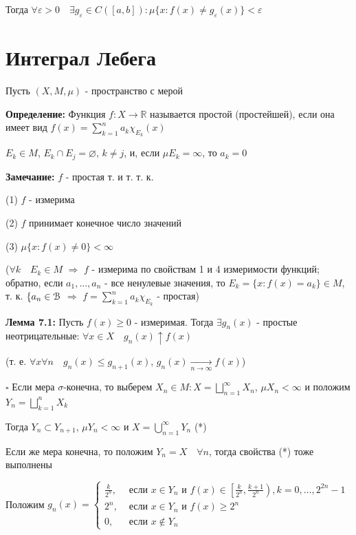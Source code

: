 \documentclass[a4paper]{report}
\begin{document}
Тогда $\forall\varepsilon>0\quad\exists g_\varepsilon\in C([a,b])\colon\mu\{x\colon f(x)\ne g_\varepsilon(x)\}<\varepsilon$




\chapter{Интеграл Лебега}

Пусть $(X,M,\mu)$ - пространство с мерой

\noindent\textbf{Определение:} Функция $f\colon X\to\mathbb R$ называется простой (простейшей), если она имеет вид $f(x)=\sum\limits_{k=1}^n a_k\chi_{E_k}(x)$

$E_k\in M$, $E_k\cap E_j=\varnothing$, $k\ne j$, и, если $\mu E_k=\infty$, то $a_k=0$
\bigskip

\noindent\textbf{Замечание:} $f$ - простая т. и т. т. к.

(1) $f$ - измерима

(2) $f$ принимает конечное число значений

(3) $\mu\{x\colon f(x)\ne0\}<\infty$

\noindent ($\forall k\quad E_k\in M$ $\Rightarrow$ $f$ - измерима по свойствам 1 и 4 измеримости функций; обратно, если $a_1,\ldots,a_n$ - все ненулевые значения, то
$E_k=\{x\colon f(x)=a_k\}\in M$, т. к. $\{a_n\in\EuScript B$ $\Rightarrow$ $f=\sum\limits_{k=1}^n a_k\chi_{E_k}$ - простая)
\bigskip

\noindent\textbf{Лемма 7.1:} Пусть $f(x)\ge0$ - измеримая. Тогда $\exists g_n(x)$ - простые неотрицательные: $\forall x\in X\quad g_n(x)\uparrow f(x)$ 

(т. е. $\forall x\forall n\quad g_n(x)\le g_{n+1}(x)$, $g_n(x)\xrightarrow[n\to\infty]{}f(x)$)

\noindent $\square$ Если мера $\sigma$-конечна, то выберем $X_n\in M\colon X=\bigsqcup\limits_{n=1}^\infty X_n$, $\mu X_n<\infty$ и положим $Y_n=\bigsqcup\limits_{k=1}^n X_k$

Тогда $Y_n\subset Y_{n+1}$, $\mu Y_n<\infty$ и $X=\bigcup\limits_{n=1}^\infty Y_n$ (*)

Если же мера конечна, то положим $Y_n=X\quad\forall n$, тогда свойства (*) тоже выполнены

Положим $g_n(x)=\begin{cases}\displaystyle\frac{k}{2^n},&\text{ если } x\in Y_n\text{ и } f(x)\in\left[\displaystyle\frac{k}{2^n},\displaystyle\frac{k+1}{2^n}\right),k=0,\ldots,2^{2n}-1\\2^n,&\text{ если } x\in Y_n \text{ и } f(x)\ge2^n\\0,&\text{ если } x\notin Y_n\end{cases}$
\end{document}
